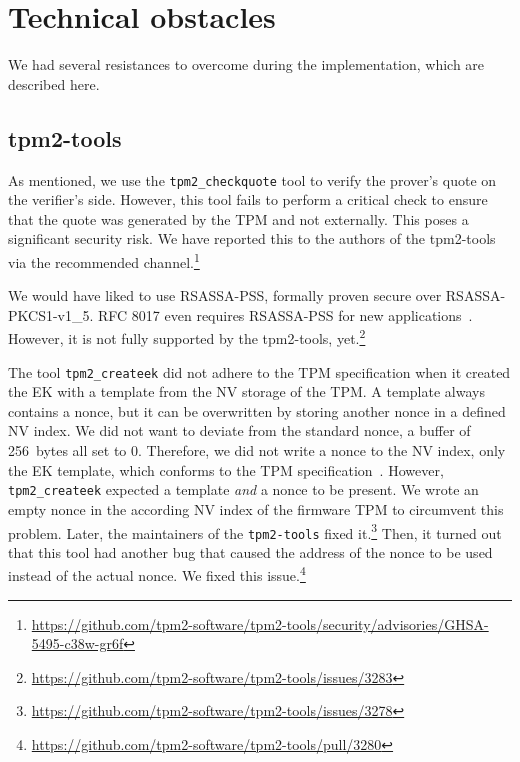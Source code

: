 \section{Technical obstacles}

We had several resistances to overcome during the implementation, which are described here.

\subsection{tpm2-tools}

As mentioned, we use the \texttt{tpm2\_checkquote} tool to verify the prover's quote on the verifier's side.
However, this tool fails to perform a critical check to ensure that the quote was generated by the TPM and not externally.
This poses a significant security risk.
We have reported this to the authors of the tpm2-tools via the recommended channel.\footnote{\url{https://github.com/tpm2-software/tpm2-tools/security/advisories/GHSA-5495-c38w-gr6f}}

We would have liked to use RSASSA-PSS, formally proven secure over RSASSA-PKCS1-v1\_5.
RFC 8017 even requires RSASSA-PSS for new applications~\cite{Moriarty2016}.
However, it is not fully supported by the tpm2-tools, yet.\footnote{\url{https://github.com/tpm2-software/tpm2-tools/issues/3283}}

The tool \texttt{tpm2\_createek} did not adhere to the TPM specification when it created the EK with a template from the NV storage of the TPM\@.
A template always contains a nonce, but it can be overwritten by storing another nonce in a defined NV index.
We did not want to deviate from the standard nonce, a buffer of 256~bytes all set to 0.
Therefore, we did not write a nonce to the NV index, only the EK template, which conforms to the TPM specification~\cite{tcg-ek}.
However, \texttt{tpm2\_createek} expected a template \emph{and} a nonce to be present.
We wrote an empty nonce in the according NV index of the firmware TPM to circumvent this problem.
Later, the maintainers of the \texttt{tpm2-tools} fixed it.\footnote{\url{https://github.com/tpm2-software/tpm2-tools/issues/3278}}
Then, it turned out that this tool had another bug that caused the address of the nonce to be used instead of the actual nonce.
We fixed this issue.\footnote{\url{https://github.com/tpm2-software/tpm2-tools/pull/3280}}


